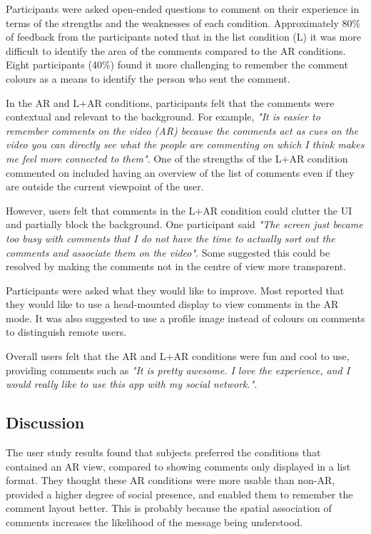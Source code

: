 Participants were asked open-ended questions to comment on their experience in terms of the strengths and the weaknesses of each condition. Approximately 80\% of feedback from the participants noted that in the list condition (L) it was more difficult to identify the area of the comments compared to the AR conditions. Eight participants (40\%) found it more challenging to remember the comment colours as a means to identify the person who sent the comment. 

In the AR and L+AR conditions, participants felt that the comments were contextual and relevant to the background. For example, \textit{"It is easier to remember comments on the video (AR) because the comments act as cues on the video you can directly see what the people are commenting on which I think makes me feel more connected to them"}. One of the strengths of the L+AR condition commented on included having an overview of the list of comments even if they are outside the current viewpoint of the user. 

However, users felt that comments in the L+AR condition could clutter the UI and partially block the background. One participant said \textit{"The screen just became too busy with comments that I do not have the time to actually sort out the comments and associate them on the video"}. Some suggested this could be resolved by making the comments not in the centre of view more transparent.
 
Participants were asked what they would like to improve. Most reported that they would like to use a head-mounted display to view comments in the AR mode.  It was also suggested to use a profile image instead of colours on comments to distinguish remote users.
 
Overall users felt that the AR and L+AR conditions were fun and cool to use, providing comments such as \textit{"It is pretty awesome. I love the experience, and I would really like to use this app with my social network."}.


\subsection{Discussion}

The user study results found that subjects preferred the conditions that contained an AR view, compared to showing comments only displayed in a list format. They thought these AR conditions were more usable than non-AR, provided a higher degree of social presence, and enabled them to remember the comment layout better. This is probably because the spatial association of comments increases the likelihood of the message being understood.

